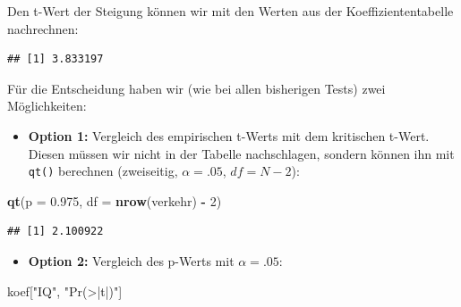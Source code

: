 \documentclass[
]{book}
\newenvironment{Shaded}{\begin{snugshade}}{\end{snugshade}}
\newcommand{\AttributeTok}[1]{\textcolor[rgb]{0.13,0.29,0.53}{#1}}
\newcommand{\DecValTok}[1]{\textcolor[rgb]{0.00,0.00,0.81}{#1}}
\newcommand{\FloatTok}[1]{\textcolor[rgb]{0.00,0.00,0.81}{#1}}
\newcommand{\FunctionTok}[1]{\textcolor[rgb]{0.13,0.29,0.53}{\textbf{#1}}}
\newcommand{\NormalTok}[1]{#1}
\newcommand{\OtherTok}[1]{\textcolor[rgb]{0.56,0.35,0.01}{#1}}
\newcommand{\SpecialCharTok}[1]{\textcolor[rgb]{0.81,0.36,0.00}{\textbf{#1}}}
\newcommand{\StringTok}[1]{\textcolor[rgb]{0.31,0.60,0.02}{#1}}
\providecommand{\tightlist}{%
  \setlength{\itemsep}{0pt}\setlength{\parskip}{0pt}}
\begin{document}
Den t-Wert der Steigung können wir mit den Werten aus der Koeffiziententabelle nachrechnen:

\begin{Shaded}
\end{Shaded}

\begin{verbatim}
## [1] 3.833197
\end{verbatim}

Für die Entscheidung haben wir (wie bei allen bisherigen Tests) zwei Möglichkeiten:

\begin{itemize}
\tightlist
\item
  \textbf{Option 1:} Vergleich des empirischen t-Werts mit dem kritischen t-Wert. Diesen müssen wir nicht in der Tabelle nachschlagen, sondern können ihn mit \texttt{qt()} berechnen (zweiseitig, \(\alpha=.05\), \(df=N-2\)):
\end{itemize}

\begin{Shaded}
\begin{Highlighting}[]
\FunctionTok{qt}\NormalTok{(}\AttributeTok{p =} \FloatTok{0.975}\NormalTok{, }\AttributeTok{df =} \FunctionTok{nrow}\NormalTok{(verkehr) }\SpecialCharTok{{-}} \DecValTok{2}\NormalTok{)}
\end{Highlighting}
\end{Shaded}

\begin{verbatim}
## [1] 2.100922
\end{verbatim}

\begin{itemize}
\tightlist
\item
  \textbf{Option 2:} Vergleich des p-Werts mit \(\alpha=.05\):
\end{itemize}

\begin{Shaded}
\begin{Highlighting}[]
\NormalTok{koef[}\StringTok{"IQ"}\NormalTok{, }\StringTok{"Pr(\textgreater{}|t|)"}\NormalTok{]}
\end{Highlighting}
\end{Shaded}
\end{document}
